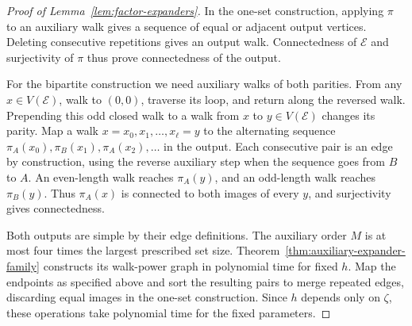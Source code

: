 \begin{proof}[Proof of Lemma~\ref{lem:factor-expanders}]
In the one-set construction, applying $\pi$ to an auxiliary walk
gives a sequence of equal or adjacent output vertices. Deleting
consecutive repetitions gives an output walk. Connectedness of
$\mathcal E$ and surjectivity of $\pi$ thus prove connectedness of
the output.

For the bipartite construction we need auxiliary walks of both
parities. From any $x\in V(\mathcal E)$, walk to $(0,0)$, traverse its loop, and
return along the reversed walk. Prepending this odd closed walk to a walk from
$x$ to $y\in V(\mathcal E)$ changes its parity. Map a walk
$x=x_0,x_1,\ldots,x_\ell=y$ to the alternating sequence
$\pi_A(x_0),\pi_B(x_1),\pi_A(x_2),\ldots$ in the output.
Each consecutive pair is an edge by construction, using the
reverse auxiliary step when the sequence goes from $B$ to $A$.
An even-length walk reaches $\pi_A(y)$, and an odd-length walk
reaches $\pi_B(y)$. Thus $\pi_A(x)$ is connected to both images of
every $y$, and surjectivity gives connectedness.

Both outputs are simple by their edge definitions.
The auxiliary order $M$ is at most four times the largest prescribed
set size. Theorem~\ref{thm:auxiliary-expander-family} constructs its
walk-power graph in polynomial time for fixed $h$. Map the endpoints
as specified above and sort the resulting pairs to merge repeated
edges, discarding equal images in the one-set construction. Since
$h$ depends only on $\zeta$, these operations take polynomial time
for the fixed parameters.
\end{proof}
